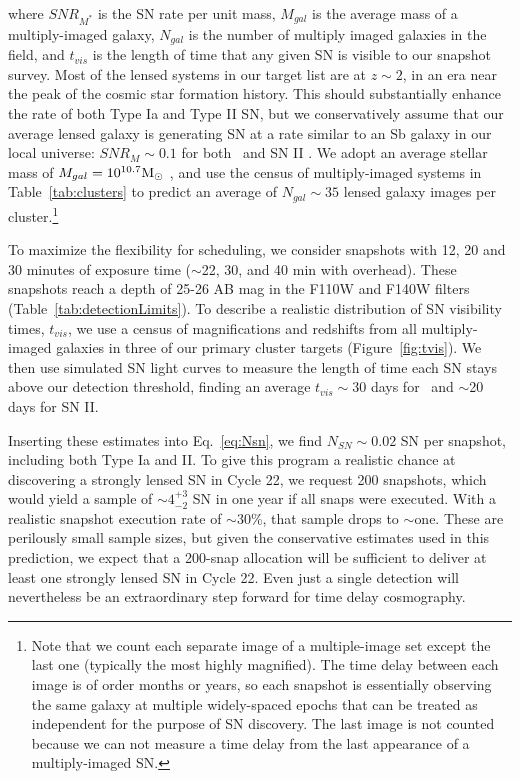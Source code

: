 \noindent where $SNR_{M^*}$ is the SN rate per unit mass, $M_{gal}$ is
the average mass of a multiply-imaged galaxy, $N_{gal}$ is the number
of multiply imaged galaxies in the field, and $t_{vis}$ is the length
of time that any given SN is visible to our snapshot survey.  Most of
the lensed systems in our target list are at $z\sim 2$, in an era near
the peak of the cosmic star formation history. This should substantially
enhance the rate of both Type Ia and Type II SN, but we conservatively
assume that our average lensed galaxy is generating SN at a rate
similar to an Sb galaxy in our local universe: $SNR_{M} \sim 0.1$ for
both \SNIa\ and SN II \citep{Mannucci:2005}.  We adopt an average
stellar mass of $M_{gal}=10^{10.7} \mbox{M$_{\odot}$}$ \citep{Tomczak:2013}, and
use the census of multiply-imaged systems in Table~\ref{tab:clusters}
to predict an average of $N_{gal}\sim 35$ lensed galaxy images per
cluster.\footnote{Note that we count each separate image of a
multiple-image set except the last one (typically the most highly
magnified).  The time delay between each image is of order months or
years, so each snapshot is essentially observing the same galaxy at
multiple widely-spaced epochs that can be treated as independent for
the purpose of SN discovery. The last image is not counted because we
can not measure a time delay from the last appearance of a
multiply-imaged SN.}

   

To maximize the flexibility for scheduling, we consider snapshots with
12, 20 and 30 minutes of exposure time ($\sim$22, 30, and 40 min with
overhead).  These snapshots reach a depth of 25-26 AB mag in the F110W
and F140W filters (Table~\ref{tab:detectionLimits}).  To describe a
realistic distribution of SN visibility times, $t_{vis}$, we use a
census of magnifications and redshifts from all multiply-imaged
galaxies in three of our primary cluster targets
(Figure~\ref{fig:tvis}).  We then use simulated SN light curves to
measure the length of time each SN stays above our detection
threshold, finding an average $t_{vis}\sim 30$ days for \SNIa\ and
$\sim$20 days for SN II.

Inserting these estimates into Eq.~\ref{eq:Nsn}, we find $N_{SN}\sim
0.02$ SN per snapshot, including both Type Ia and II.  To give this
program a realistic chance at discovering a strongly lensed SN in
Cycle 22, we request 200 snapshots, which would yield a sample of
$\sim 4 ^{+3}_{-2}$ SN in one year if all snaps were executed.  With a
realistic snapshot execution rate of $\sim$30\%, that sample drops to
$\sim$one.  These are perilously small sample sizes, but given the
conservative estimates used in this prediction, we expect that a
200-snap allocation will be sufficient to deliver at least one
strongly lensed SN in Cycle 22.  Even just a single detection will
nevertheless be an extraordinary step forward for time delay
cosmography. 

